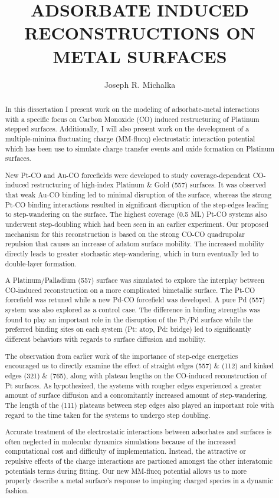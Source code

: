 \documentclass[draft]{nddiss2e}
\begin{document}
\begin{abstract}
\title{ADSORBATE INDUCED RECONSTRUCTIONS ON METAL SURFACES}
\author{Joseph R. Michalka}
In this dissertation I present work on the modeling of adsorbate-metal
interactions with a specific focus on Carbon Monoxide (CO) induced
restructuring of Platinum stepped surfaces. Additionally, I will also present
work on the development of a multiple-minima fluctuating charge (MM-flucq)
electrostatic interaction potential which has been use to simulate charge
transfer events and oxide formation on Platinum surfaces.

New Pt-CO and Au-CO forcefields were developed to study coverage-dependent
CO-induced restructuring of high-index Platinum \& Gold (557) surfaces. It was observed
that weak Au-CO binding led to minimal disruption of the surface, whereas the
strong Pt-CO binding interactions resulted in significant disruption of the
step-edges leading to step-wandering on the surface. The highest coverage (0.5
ML) Pt-CO systems also underwent step-doubling which had been seen in an
earlier experiment. Our proposed mechanism for this reconstruction is based on
the strong CO-CO quadrupolar repulsion that causes an increase of adatom surface
mobility. The increased mobility directly leads to greater stochastic
step-wandering, which in turn eventually led to double-layer formation.

A Platinum/Palladium (557) surface was simulated to explore the interplay between
CO-induced reconstruction on a more complicated bimetallic surface. The Pt-CO
forcefield was retuned while a new Pd-CO forcefield was developed. A pure Pd
(557) system was also explored as a control case. The difference in binding
strengths was found to play an important role in the disruption of the Pt/Pd
surface while the preferred binding sites on each system (Pt: atop, Pd: bridge)
led to significantly different behaviors with regards to surface diffusion and
mobility.

The observation from earlier work of the importance of step-edge energetics
encouraged us to directly examine the effect of straight edges (557) \& (112)
and kinked edges (321) \& (765), along with plateau lengths on the CO-induced
reconstruction of Pt surfaces. As hypothesized, the systems with rougher edges
experienced a greater amount of surface diffusion and a concomitantly increased
amount of step-wandering. The length of the (111) plateaus between step edges
also played an important role with regard to the time taken for the systems to
undergo step doubling.

Accurate treatment of the electrostatic interactions between adsorbates and
surfaces is often neglected in molecular dynamics simulations because of the
increased computational cost and difficulty of implementation. Instead, the
attractive or repulsive effects of the charge interactions are partioned
amongst the other interatomic potentials terms during fitting. Our new MM-flucq
potential allows us to more properly describe a metal surface's response to
impinging charged species in a dynamic fashion.

\end{abstract}
\end{document}
